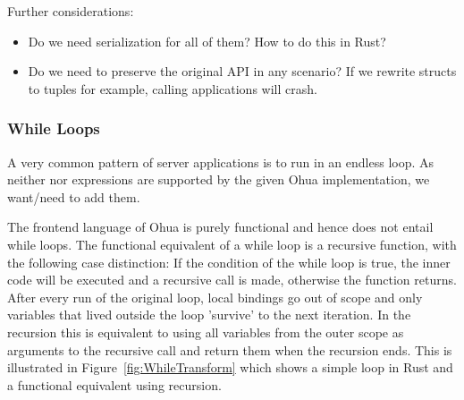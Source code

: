 Further considerations:
\begin{itemize}    
    \item Do we need serialization for all of them? How to do this in Rust?
    \item Do we need to preserve the original API in any scenario? If we rewrite structs to tuples for example, calling applications will crash.
\end{itemize}

\subsubsection{While Loops}
\label{subsubsec:WhileLoops}
A very common pattern of server applications is to run in an endless loop. As neither  nor  expressions are supported by the given Ohua implementation, we want/need to add them. 

The frontend language of Ohua is purely functional and hence does not entail while loops. The functional equivalent of a while loop is a recursive function, with the following case distinction: If the condition of the while loop is true, the inner code will be executed and a recursive call is made, otherwise the function returns. After every run of the original loop, local bindings go out of scope and only variables that lived outside the loop 'survive' to the next iteration. In the recursion this is equivalent to using all variables from the outer scope as arguments to the recursive call and return them when the recursion ends. This is illustrated in Figure~\ref{fig:WhileTransform} which shows a simple  loop in Rust and a functional equivalent using recursion. 

